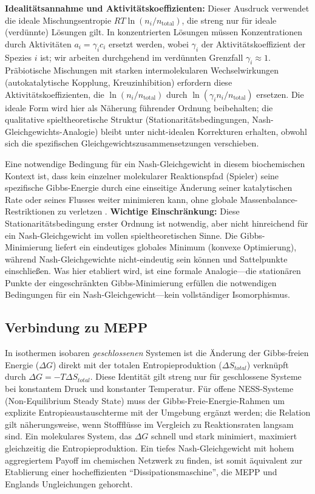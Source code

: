 \documentclass[12pt,a4paper]{article}
\theoremstyle{remark}
\begin{document}
\noindent
\textbf{Idealit\"atsannahme und Aktivit\"atskoeffizienten:} Dieser Ausdruck verwendet die ideale Mischungsentropie $RT\ln(n_i/n_{\mathrm{total}})$, die streng nur f\"ur ideale (verd\"unnte) L\"osungen gilt. In konzentrierten L\"osungen m\"ussen Konzentrationen durch Aktivit\"aten $a_i = \gamma_i c_i$ ersetzt werden, wobei $\gamma_i$ der Aktivit\"atskoeffizient der Spezies $i$ ist; wir arbeiten durchgehend im verd\"unnten Grenzfall $\gamma_i \approx 1$. Pr\"abiotische Mischungen mit starken intermolekularen Wechselwirkungen (autokatalytische Kopplung, Kreuzinhibition) erfordern diese Aktivit\"atskoeffizienten, die $\ln(n_i/n_{\mathrm{total}})$ durch $\ln(\gamma_i n_i/n_{\mathrm{total}})$ ersetzen. Die ideale Form wird hier als N\"aherung f\"uhrender Ordnung beibehalten; die qualitative spieltheoretische Struktur (Stationarit\"atsbedingungen, Nash-Gleichgewichts-Analogie) bleibt unter nicht-idealen Korrekturen erhalten, obwohl sich die spezifischen Gleichgewichtszusammensetzungen verschieben.

Eine notwendige Bedingung f\"ur ein Nash-Gleichgewicht in diesem biochemischen Kontext ist, dass kein einzelner molekularer Reaktionspfad (Spieler) seine spezifische Gibbs-Energie durch eine einseitige \"Anderung seiner katalytischen Rate oder seines Flusses weiter minimieren kann, ohne globale Massenbalance-Restriktionen zu verletzen \citep{MetabolicNash}. \textbf{Wichtige Einschr\"ankung:} Diese Stationarit\"atsbedingung erster Ordnung ist notwendig, aber nicht hinreichend f\"ur ein Nash-Gleichgewicht im vollen spieltheoretischen Sinne. Die Gibbs-Minimierung liefert ein eindeutiges globales Minimum (konvexe Optimierung), w\"ahrend Nash-Gleichgewichte nicht-eindeutig sein k\"onnen und Sattelpunkte einschlie\ss{}en. Was hier etabliert wird, ist eine formale Analogie---die station\"aren Punkte der eingeschr\"ankten Gibbs-Minimierung erf\"ullen die notwendigen Bedingungen f\"ur ein Nash-Gleichgewicht---kein vollst\"andiger Isomorphismus.

\subsection{Verbindung zu MEPP}

In isothermen isobaren \emph{geschlossenen} Systemen ist die \"Anderung der Gibbs-freien Energie ($\Delta G$) direkt mit der totalen Entropieproduktion ($\Delta S_{total}$) verkn\"upft durch $\Delta G = -T\Delta S_{total}$. Diese Identit\"at gilt streng nur f\"ur geschlossene Systeme bei konstantem Druck und konstanter Temperatur. F\"ur offene NESS-Systeme (Non-Equilibrium Steady State) muss der Gibbs-Freie-Energie-Rahmen um explizite Entropieaustauschterme mit der Umgebung erg\"anzt werden; die Relation gilt n\"aherungsweise, wenn Stofffl\"usse im Vergleich zu Reaktionsraten langsam sind. Ein molekulares System, das $\Delta G$ schnell und stark minimiert, maximiert gleichzeitig die Entropieproduktion. Ein tiefes Nash-Gleichgewicht mit hohem aggregiertem Payoff im chemischen Netzwerk zu finden, ist somit \"aquivalent zur Etablierung einer hocheffizienten ``Dissipationsmaschine'', die MEPP und Englands Ungleichungen gehorcht.
\end{document}
